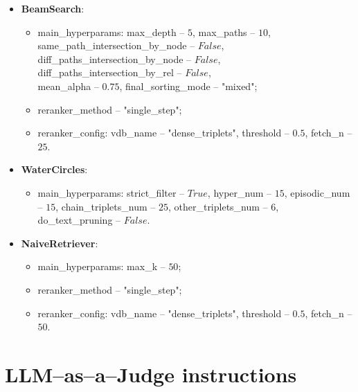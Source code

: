 \begin{itemize}
    \item \textbf{BeamSearch}: 
    \begin{itemize}
        \item main\_hyperparams: max\_depth -- $5$, max\_paths -- $10$, same\_path\_intersection\_by\_node -- $False$, \\diff\_paths\_intersection\_by\_node -- $False$, diff\_paths\_intersection\_by\_rel -- $False$, \\mean\_alpha -- $0.75$, final\_sorting\_mode -- "mixed";
        \item reranker\_method -- "single\_step";
        \item reranker\_config: vdb\_name -- "dense\_triplets", threshold -- $0.5$, fetch\_n -- $25$.
    \end{itemize}
    
    \item \textbf{WaterCircles}: 
    \begin{itemize}
        \item main\_hyperparams: strict\_filter -- $True$, hyper\_num -- $15$, episodic\_num -- $15$, chain\_triplets\_num -- $25$, other\_triplets\_num -- $6$, do\_text\_pruning -- $False$.
    \end{itemize}
    
        
    \item \textbf{NaiveRetriever}: 
    \begin{itemize}
        \item main\_hyperparams: max\_k -- $50$; 
        \item reranker\_method -- "single\_step";
        \item reranker\_config: vdb\_name -- "dense\_triplets", threshold -- $0.5$, fetch\_n -- $50$.
    \end{itemize}
\end{itemize}


\section{LLM--as--a--Judge instructions}
\label{app:judgescore_hyperp}

